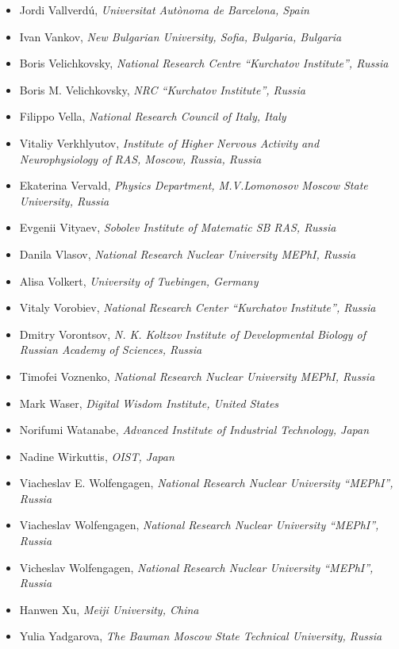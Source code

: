 \documentclass[10pt,fleqn,openany]{book} %
\begin{document}
\begin{itemize}
		\item Jordi Vallverdú, \textit{Universitat Autònoma de Barcelona, Spain}
		\item Ivan Vankov, \textit{New Bulgarian University, Sofia, Bulgaria, Bulgaria}
		\item Boris Velichkovsky, \textit{National Research Centre ``Kurchatov Institute'', Russia}
		\item Boris M. Velichkovsky, \textit{NRC ``Kurchatov Institute'', Russia}
		\item Filippo Vella, \textit{National Research Council of Italy, Italy}
		\item Vitaliy Verkhlyutov, \textit{Institute of Higher Nervous Activity and Neurophysiology of RAS, Moscow, Russia, Russia}
		\item Ekaterina Vervald, \textit{Physics Department, M.V.Lomonosov Moscow State University, Russia}
		\item Evgenii Vityaev, \textit{Sobolev Institute of Matematic SB RAS, Russia}
		\item Danila Vlasov, \textit{National Research Nuclear University MEPhI, Russia}
		\item Alisa Volkert, \textit{University of Tuebingen, Germany}
		\item Vitaly Vorobiev, \textit{National Research Center ``Kurchatov Institute'', Russia}
		\item Dmitry Vorontsov, \textit{N. K. Koltzov Institute of Developmental Biology of Russian Academy of Sciences, Russia}
		\item Timofei Voznenko, \textit{National Research Nuclear University MEPhI, Russia}
		\item Mark Waser, \textit{Digital Wisdom Institute, United States}
		\item Norifumi Watanabe, \textit{Advanced Institute of Industrial Technology, Japan}
		\item Nadine Wirkuttis, \textit{OIST, Japan}
		\item Viacheslav E. Wolfengagen, \textit{National Research Nuclear University ``MEPhI'', Russia}
		\item Viacheslav Wolfengagen, \textit{National Research Nuclear University ``MEPhI'', Russia}
		\item Vicheslav Wolfengagen, \textit{National Research Nuclear University ``MEPhI'', Russia}
		\item Hanwen Xu, \textit{Meiji University, China}
		\item Yulia Yadgarova, \textit{The Bauman Moscow State Technical University, Russia}

\end{itemize}
\end{document}
